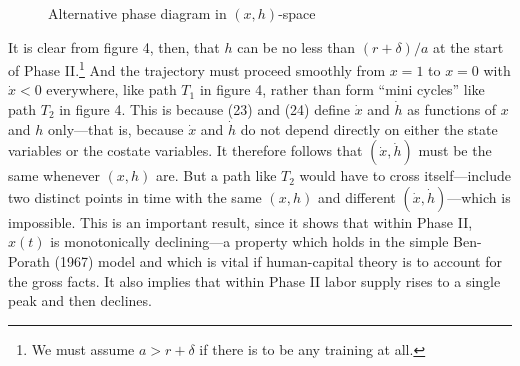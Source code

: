 \documentclass[11pt,fleqn]{article}
\begin{document}
\begin{figure}[htbp]
\centering
{}
\caption{Alternative phase diagram in $(x, h)$-space}
\label{fig:phase_xh_space}
\end{figure}

It is clear from figure 4, then, that $h$ can be no less than $(r + \delta)/a$ at the start of Phase II.\footnote{We must assume $a > r + \delta$ if there is to be any training at all.} And the trajectory must proceed smoothly from $x = 1$ to $x = 0$ with $\dot{x} < 0$ everywhere, like path $T_1$ in figure 4, rather than form ``mini cycles'' like path $T_2$ in figure 4. This is because (23) and (24) define $\dot{x}$ and $\dot{h}$ as functions of $x$ and $h$ only---that is, because $\dot{x}$ and $\dot{h}$ do not depend directly on either the state variables or the costate variables. It therefore follows that $(\dot{x}, \dot{h})$ must be the same whenever $(x, h)$ are. But a path like $T_2$ would have to cross itself---include two distinct points in time with the same $(x, h)$ and different $(\dot{x}, \dot{h})$---which is impossible. This is an important result, since it shows that within Phase II, $x(t)$ is monotonically declining---a property which holds in the simple Ben-Porath (1967) model and which is vital if human-capital theory is to account for the gross facts. It also implies that within Phase II labor supply rises to a single peak and then declines.
\end{document}
